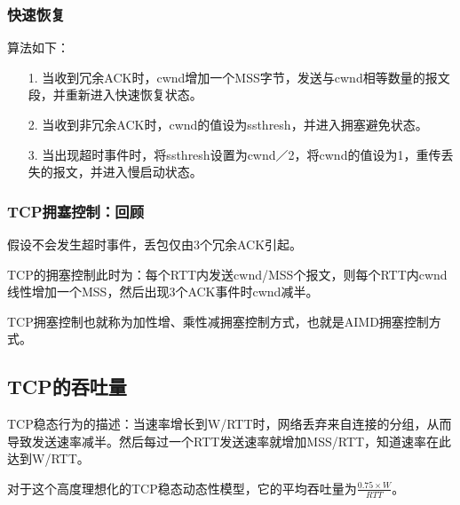 \documentclass[a4paper,left=2.5cm,right=2.5cm,11pt]{article}
\begin{document}
\subsubsection{快速恢复}
	算法如下：
	\begin{itemize}
		\item[1.] 当收到冗余ACK时，cwnd增加一个MSS字节，发送与cwnd相等数量的报文段，并重新进入快速恢复状态。
		\item[2.] 当收到非冗余ACK时，cwnd的值设为ssthresh，并进入拥塞避免状态。
		\item[3.] 当出现超时事件时，将ssthresh设置为cwnd／2，将cwnd的值设为1，重传丢失的报文，并进入慢启动状态。
	\end{itemize}

\subsubsection{TCP拥塞控制：回顾}
	假设不会发生超时事件，丢包仅由3个冗余ACK引起。\par

	TCP的拥塞控制此时为：每个RTT内发送cwnd/MSS个报文，则每个RTT内cwnd线性增加一个MSS，然后出现3个ACK事件时cwnd减半。\par

	TCP拥塞控制也就称为加性增、乘性减拥塞控制方式，也就是AIMD拥塞控制方式。

\subsection{TCP的吞吐量}
	TCP稳态行为的描述：当速率增长到W/RTT时，网络丢弃来自连接的分组，从而导致发送速率减半。然后每过一个RTT发送速率就增加MSS/RTT，知道速率在此达到W/RTT。\par

	对于这个高度理想化的TCP稳态动态性模型，它的平均吞吐量为$\frac{0.75\times W}{RTT}$。
	
\end{document}
